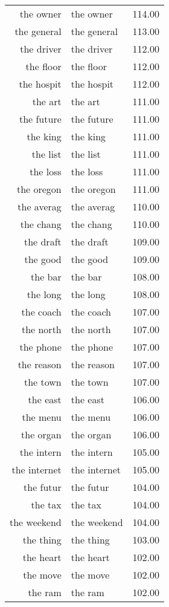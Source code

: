 \begin{table}[ht]
\begin{tabular}{rlr}
  the owner & the owner & 114.00 \\ 
  the general & the general & 113.00 \\ 
  the driver & the driver & 112.00 \\ 
  the floor & the floor & 112.00 \\ 
  the hospit & the hospit & 112.00 \\ 
  the art & the art & 111.00 \\ 
  the future & the future & 111.00 \\ 
  the king & the king & 111.00 \\ 
  the list & the list & 111.00 \\ 
  the loss & the loss & 111.00 \\ 
  the oregon & the oregon & 111.00 \\ 
  the averag & the averag & 110.00 \\ 
  the chang & the chang & 110.00 \\ 
  the draft & the draft & 109.00 \\ 
  the good & the good & 109.00 \\ 
  the bar & the bar & 108.00 \\ 
  the long & the long & 108.00 \\ 
  the coach & the coach & 107.00 \\ 
  the north & the north & 107.00 \\ 
  the phone & the phone & 107.00 \\ 
  the reason & the reason & 107.00 \\ 
  the town & the town & 107.00 \\ 
  the east & the east & 106.00 \\ 
  the menu & the menu & 106.00 \\ 
  the organ & the organ & 106.00 \\ 
  the intern & the intern & 105.00 \\ 
  the internet & the internet & 105.00 \\ 
  the futur & the futur & 104.00 \\ 
  the tax & the tax & 104.00 \\ 
  the weekend & the weekend & 104.00 \\ 
  the thing & the thing & 103.00 \\ 
  the heart & the heart & 102.00 \\ 
  the move & the move & 102.00 \\ 
  the ram & the ram & 102.00 \\ 

\end{tabular}
\end{table}
